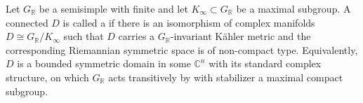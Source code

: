 \begin{definition} \label{definition:hermitian_symmetric_domain}
    

    Let $G_{\mathbb{R}}$ be a  semisimple  with finite  and let $K_\infty \subset G_{\mathbb{R}}$ be a maximal  subgroup.  A connected  $D$ is called a  if there is an isomorphism of complex manifolds $D \cong G_{\mathbb{R}}/K_\infty$ such that $D$ carries a $G_{\mathbb{R}}$-invariant Kähler metric and the corresponding Riemannian symmetric space is of non-compact type. Equivalently, $D$ is a bounded symmetric domain in some $\mathbb{C}^n$ with its standard complex structure, on which $G_{\mathbb{R}}$ acts transitively by  with stabilizer a maximal compact subgroup.
\end{definition}
